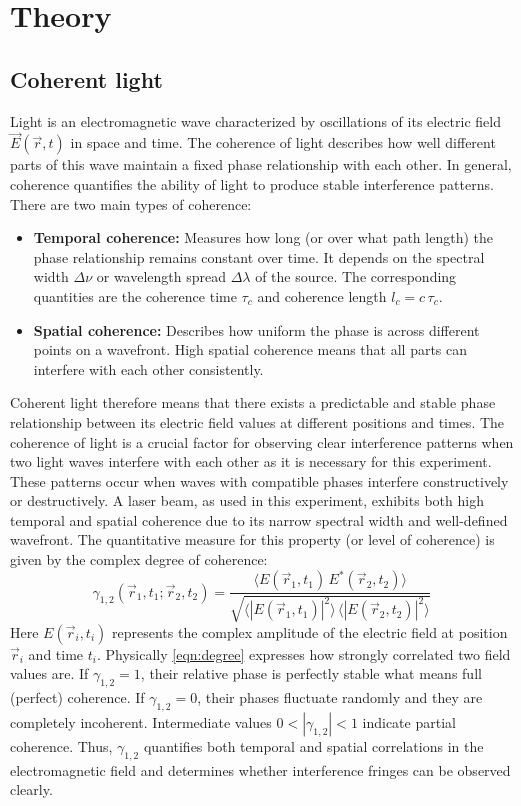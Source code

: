 \section{Theory}

\subsection{Coherent light}
Light is an electromagnetic wave characterized by oscillations of its electric field $\vec{E}(\vec{r},t)$ in space and time. 
The coherence of light describes how well different parts of this wave maintain a fixed phase relationship with each other.
In general, coherence quantifies the ability of light to produce stable interference patterns.
\noindent
There are two main types of coherence:
\begin{itemize}
    \item \textbf{Temporal coherence:} Measures how long (or over what path length) the phase relationship remains constant over time. It depends on the spectral width $\Delta\nu$ or wavelength spread $\Delta\lambda$ of the source. The corresponding quantities are the coherence time $\tau_c$ and coherence length $l_c = c\,\tau_c$.
    \item \textbf{Spatial coherence:} Describes how uniform the phase is across different points on a wavefront. High spatial coherence means that all parts can interfere with each other consistently.
\end{itemize} 
Coherent light therefore means that there exists a predictable and stable phase relationship between its electric field values at different positions and times. The coherence of light is a crucial factor for observing clear interference patterns when two light waves interfere with each other as it is necessary for this experiment. These patterns occur when waves with compatible phases interfere constructively or destructively. A laser beam, as used in this experiment, exhibits both high temporal and spatial coherence due to its narrow spectral width and well-defined wavefront.
\noindent
The quantitative measure for this property (or level of coherence) is given by the complex degree of coherence:
\begin{equation}
    \gamma_{1,2}(\vec{r}_1,t_1;\vec{r}_2,t_2)=
    \frac{\langle E(\vec{r}_1,t_1)\,E^*(\vec{r}_2,t_2) \rangle}
    {\sqrt{\langle |E(\vec{r}_1,t_1)|^2\rangle\,\langle |E(\vec{r}_2,t_2)|^2\rangle}}
    \label{eqn:degree}
\end{equation}
Here $E(\vec{r}_i,t_i)$ represents the complex amplitude of the electric field at position $\vec{r}_i$ and time $t_i$.
\noindent
Physically \autoref{eqn:degree} expresses how strongly correlated two field values are. If $\gamma_{1,2}=1$, their relative phase is perfectly stable what means full (perfect) coherence. If $\gamma_{1,2}=0$, their phases fluctuate randomly and they are completely incoherent. Intermediate values $0<|\gamma_{1,2}|<1$ indicate partial coherence.
\noindent
Thus, $\gamma_{1,2}$ quantifies both temporal and spatial correlations in the electromagnetic field and determines whether interference fringes can be observed clearly.


